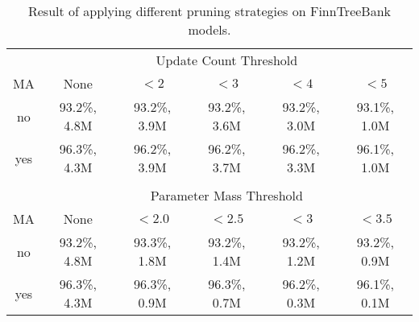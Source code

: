 \begin{table}[htb!]
\begin{center}
\begin{tabular}{c|ccccc}
\multicolumn{1}{c}{}        & \multicolumn{5}{c}{Update Count Threshold}\\
MA                     & None           & $< 2$        & $< 3$        & $< 4$        & $< 5$       \\
\hline
no                     & 93.2\%, 4.8M   & 93.2\%, 3.9M & 93.2\%, 3.6M & 93.2\%, 3.0M & 93.1\%, 1.0M \\
yes                    & 96.3\%, 4.3M   & 96.2\%, 3.9M & 96.2\%, 3.7M & 96.2\%, 3.3M & 96.1\%, 1.0M \\
                       &                &              &              &              &              \\
\multicolumn{1}{c}{}                        & \multicolumn{5}{c}{Parameter Mass Threshold}\\
MA                     & None         & $< 2.0$      & $< 2.5$      & $< 3$      & $< 3.5$        \\
\hline
no                     & 93.2\%, 4.8M & 93.3\%, 1.8M & 93.2\%, 1.4M & 93.2\%, 1.2M & 93.2\%, 0.9M \\
yes                    & 96.3\%, 4.3M & 96.3\%, 0.9M & 96.3\%, 0.7M & 96.2\%, 0.3M & 96.1\%, 0.1M \\
\end{tabular}
\caption{Result of applying different pruning strategies on FinnTreeBank models.}\label{tab:pruning-ftb}
\end{center}
\end{table}

